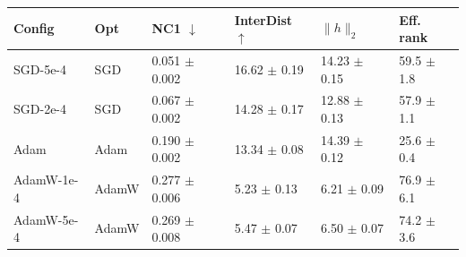\begin{tabularx}{\linewidth}{@{}l l Z Z Z Z@{}}
\toprule
Config & Opt & NC1 $\downarrow$ & InterDist $\uparrow$ & $\|h\|_2$ & Eff. rank \\
\midrule
SGD-5e-4 & SGD & 0.051 $\pm$ 0.002 & 16.62 $\pm$ 0.19 & 14.23 $\pm$ 0.15 & 59.5 $\pm$ 1.8 \\
SGD-2e-4 & SGD & 0.067 $\pm$ 0.002 & 14.28 $\pm$ 0.17 & 12.88 $\pm$ 0.13 & 57.9 $\pm$ 1.1 \\
Adam & Adam & 0.190 $\pm$ 0.002 & 13.34 $\pm$ 0.08 & 14.39 $\pm$ 0.12 & 25.6 $\pm$ 0.4 \\
AdamW-1e-4 & AdamW & 0.277 $\pm$ 0.006 & 5.23 $\pm$ 0.13 & 6.21 $\pm$ 0.09 & 76.9 $\pm$ 6.1 \\
AdamW-5e-4 & AdamW & 0.269 $\pm$ 0.008 & 5.47 $\pm$ 0.07 & 6.50 $\pm$ 0.07 & 74.2 $\pm$ 3.6 \\
\bottomrule
\end{tabularx}

